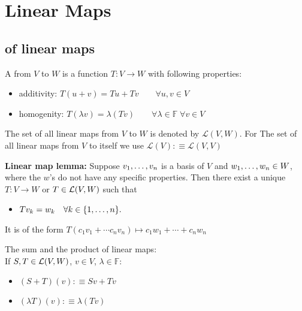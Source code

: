 \chapter{Linear Maps}
\section{\vs of linear maps}

\begin{mydef}
    A \lm from $V$ to $W$ is a function $T:V\to W$ with following properties:
    \begin{itemize}
    	\item additivity: $T(u+v)=Tu + Tv \qquad \forall u,v \in V$
    	\item homogenity: $T(\lambda v)=\lambda (Tv) \qquad 
    	\forall \lambda \in \mathbb{F} \; \forall v\in V$
    \end{itemize}
\end{mydef}

\begin{mydef}
    The set of all linear maps from $V$ to $W$ is denoted by $\mathcal{L}(V,W)$. For The set of all linear maps from $V$ to itself we use $\mathcal{L}(V) :\equiv \mathcal{L}(V,V)$
\end{mydef}

\setcounter{thm}{3}
\begin{thm}
    \textbf{Linear map lemma: }
    Suppose $v_1, \dots, v_n$ is a basis of $V$ and $w_1, \dots, w_n \in W$, where the $w$'s do not have any specific properties. Then there exist a unique \lm $T:V\to W$ or $T \in \mathcal{L}(V,W)$ such that
    \begin{itemize}
       	\item[] $Tv_{k} = w_k \quad \forall k \in \{1, \dots, n \}.$
    \end{itemize}
    It is of the form $T(c_1 v_1 + \cdots c_n v_n) \mapsto c_1 w_1 + \cdots + c_n w_n$
\end{thm}

\setcounter{thm}{4}
\begin{mydef}
    The sum and the product of linear maps:\\
    If $S, T \in {\mathcal{L}(V,W)}$, $v \in V$, $\lambda \in \mathbb{F} $:
    \begin{itemize}
    	\item $(S+T)(v) :\equiv Sv+Tv$
    	\item $(\lambda T)(v) : \equiv \lambda (Tv)$
    \end{itemize}
\end{mydef}

